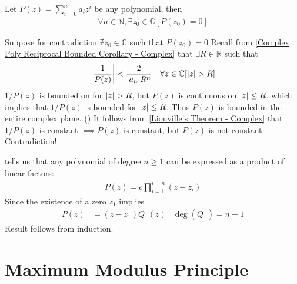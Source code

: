 \documentclass[12pt, english]{book}
\makeatletter
\renewenvironment{proof}[1][\proofname]{\par
	\pushQED{\qed}%
	\normalfont \topsep6\p@\@plus6\p@\relax
	\list{}{%
		\settowidth{\leftmargin}{\itshape\proofname:\hskip\labelsep}%
		\setlength{\labelwidth}{0pt}%
		\setlength{\itemindent}{-\leftmargin}%
		}%
	\item[\hskip\labelsep\itshape#1\@addpunct{:}]\ignorespaces
	}{\popQED\endlist\@endpefalse}
\makeatother
\begin{document}
	\begin{theorem}
		\label{Fundamental Theorem of Algebra - Complex}
		Let \(P(z) = \sum_{i=0}^{n} a_i z^i\) be any polynomial, then
		\begin{align*}
			\forall n \in \mathbb{N}, \exists z_0 \in \mathbb{C}[P(z_0) = 0]
		\end{align*}
	\end{theorem}
	\begin{proof}
		Suppose for contradiction \(\nexists z_0 \in \mathbb{C}\) such that \(P(z_0) = 0\)
		Recall from \cref{Complex Poly Reciprocal Bounded Corollary - Complex} that \(\exists R \in \mathbb{R}\) such that 
		\begin{align*}
			\abs{\frac{1}{P(z)}} &< \frac{2}{\abs{a_n} R^n} & \forall z \in \mathbb{C} [\abs{z} > R]
		\end{align*}
		\(1/P(z)\) is bounded on for \(\abs{z}>R\), but \(P(z)\) is continuous on \(\abs{z}\leq R\), which implies that \(1/P(z)\) is bounded for \(\abs{z}\leq R\). Thus \(P(z)\) is bounded in the entire complex plane. ()
		It follows from \cref{Liouville's Theorem - Complex} that \(1/P(z)\) is constant \(\implies P(z)\) is constant, but \(P(z)\) is not constant. Contradiction!
	\end{proof}

	 tells us that any polynomial of degree \(n\geq 1\) can be expressed as a product of linear factors:
	\begin{align*}
		P(z) = c \prod_{i = 1}^{i=n} (z-z_i)
	\end{align*}
	Since the existence of a zero \(z_1\) implies 
	\begin{align*}
		P(z) &= (z-z_1)Q_1(z) & \deg (Q_1) = n-1
	\end{align*}
	Result follows from induction.
	
	\section{Maximum Modulus Principle} \label{Maximum Modulus Principle Section - Complex}
	
\end{document}
